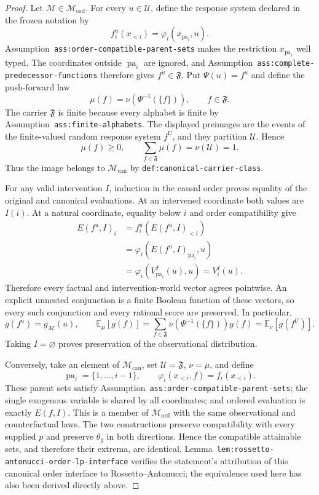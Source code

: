 \documentclass{article}
\begin{document}
\begin{proof}
Let \(\mathcal M\in\mathcal M_{\mathrm{ord}}\). For every \(u\in\mathcal U\), define the response system declared in the frozen notation by
\[
 f_i^u(x_{<i})=\varphi_i(x_{\operatorname{pa}_i},u).
\]
Assumption~\texttt{ass:order-compatible-parent-sets} makes the restriction \(x_{\operatorname{pa}_i}\) well typed. The coordinates outside \(\operatorname{pa}_i\) are ignored, and Assumption~\texttt{ass:complete-predecessor-functions} therefore gives \(f^u\in\mathfrak F\). Put \(\Psi(u)=f^u\) and define the push-forward law
\[
 \mu(f)=\nu\!\left(\Psi^{-1}(\{f\})\right),
 \qquad f\in\mathfrak F.
\]
The carrier \(\mathfrak F\) is finite because every alphabet is finite by Assumption~\texttt{ass:finite-alphabets}. The displayed preimages are the events of the finite-valued random response system \(f^U\), and they partition \(\mathcal U\). Hence
\[
 \mu(f)\geq0,
 \qquad
 \sum_{f\in\mathfrak F}\mu(f)=\nu(\mathcal U)=1.
\]
Thus the image belongs to \(\mathcal M_{\mathrm{can}}\) by \texttt{def:canonical-carrier-class}.

For any valid intervention \(I\), induction in the causal order proves equality of the original and canonical evaluations. At an intervened coordinate both values are \(I(i)\). At a natural coordinate, equality below \(i\) and order compatibility give
\[
 \begin{aligned}
 E(f^u,I)_i
 &=f_i^u(E(f^u,I)_{<i})\\
 &=\varphi_i(E(f^u,I)_{\operatorname{pa}_i},u)\\
 &=\varphi_i(V^I_{\operatorname{pa}_i}(u),u)
 =V_i^I(u).
 \end{aligned}
\]
Therefore every factual and intervention-world vector agrees pointwise. An explicit unnested conjunction is a finite Boolean function of these vectors, so every such conjunction and every rational score are preserved. In particular,
\[
 g(f^u)=g_{\mathcal M}(u),
 \qquad
 \mathbb E_{\mu}[g(f)]
 =\sum_{f\in\mathfrak F}\nu(\Psi^{-1}(\{f\}))g(f)
 =\mathbb E_{\nu}[g(f^U)].
\]
Taking \(I=\varnothing\) proves preservation of the observational distribution.

Conversely, take an element of \(\mathcal M_{\mathrm{can}}\), set \(\mathcal U=\mathfrak F\), \(\nu=\mu\), and define
\[
 \operatorname{pa}_i=\{1,\ldots,i-1\},
 \qquad
 \varphi_i(x_{<i},f)=f_i(x_{<i}).
\]
These parent sets satisfy Assumption~\texttt{ass:order-compatible-parent-sets}; the single exogenous variable is shared by all coordinates; and ordered evaluation is exactly \(E(f,I)\). This is a member of \(\mathcal M_{\mathrm{ord}}\) with the same observational and counterfactual laws. The two constructions preserve compatibility with every supplied \(p\) and preserve \(\theta_g\) in both directions. Hence the compatible attainable sets, and therefore their extrema, are identical. Lemma~\texttt{lem:rossetto-antonucci-order-lp-interface} verifies the statement's attribution of this canonical order interface to Rossetto--Antonucci; the equivalence used here has also been derived directly above.
\end{proof}
\end{document}
